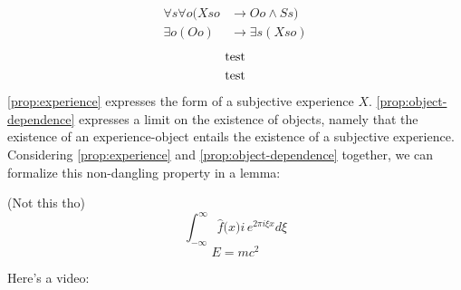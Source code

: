 \documentclass[leqno]{article}
\begin{document}
	\begin{align}
		\label{prop:experience}\forall s \forall o (Xso & \rightarrow Oo \land Ss)    \\
		\label{prop:object-dependence}\exists o (Oo)    & \rightarrow \exists s (Xso)
	\end{align}
	\begin{align}
		\label{test}\textnormal{test}  \\
		\label{test2}\textnormal{test}
	\end{align}
	\eqref{prop:experience} expresses the form of a subjective experience $X$. \eqref{prop:object-dependence}
	expresses a limit on the existence of objects, namely that the existence of an
	experience-object entails the existence of a subjective experience.
	Considering \eqref{prop:experience} and \eqref{prop:object-dependence}
	together, we can formalize this non-dangling property in a lemma:%

	(Not this tho)
	\[
		\int_{-\infty}^{\infty}\hat{f}\lparen{}x \rparen{}i\,e^{2\pi{} i\xi{} x}d\xi{}
	\]
	\[
		E=mc^{2}
	\]

	Here's a video: 

	\graphicspath{{./clyde2.webp}}
\end{document}
